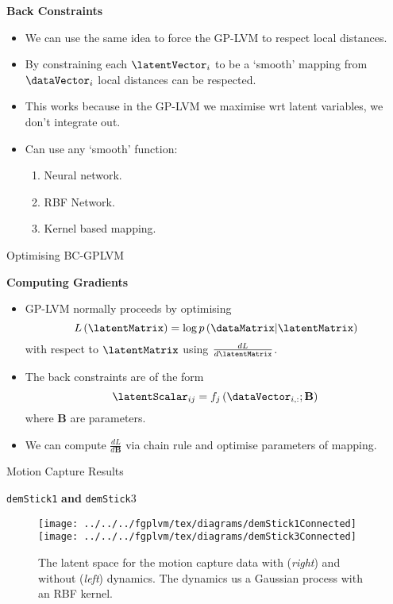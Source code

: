 \textbf{Back Constraints}
\begin{itemize}
\item We can use the same idea to force the GP-LVM to respect local distances.\cite{Lawrence:backconstraints06}
\item By constraining each $\latentVector_{i}$ to be a `smooth' mapping
from $\dataVector_{i}$ local distances can be respected.
\item This works because in the GP-LVM we maximise wrt latent variables,
we don't integrate out.
\item Can use any `smooth' function:

\begin{enumerate}
\item Neural network.
\item RBF Network.
\item Kernel based mapping.
\end{enumerate}
\end{itemize}
Optimising BC-GPLVM

\textbf{Computing Gradients}
\begin{itemize}
\item GP-LVM normally proceeds by optimising \[
L\left(\latentMatrix\right)=\log p\left(\dataMatrix|\latentMatrix\right)\]
with respect to $\latentMatrix$ using $\frac{dL}{d\latentMatrix}$.
\item The back constraints are of the form\[
\latentScalar_{ij}=f_{j}\left(\dataVector_{i,:};\mathbf{B}\right)\]
where $\mathbf{B}$ are parameters.
\item We can compute $\frac{dL}{d\mathbf{B}}$ via chain rule and optimise
parameters of mapping.
\end{itemize}
Motion Capture Results

\texttt{demStick1} \textbf{and} \texttt{demStick}3

%
\begin{figure}
\begin{centering}
\texttt{[image: ../../../fgplvm/tex/diagrams/demStick1Connected]}\texttt{[image: ../../../fgplvm/tex/diagrams/demStick3Connected]}
\par\end{centering}

\caption{The latent space for the motion capture data with (\emph{right}) and
without (\emph{left}) dynamics. The dynamics us a Gaussian process
with an RBF kernel. \vspace{-1cm}
}

\end{figure}


